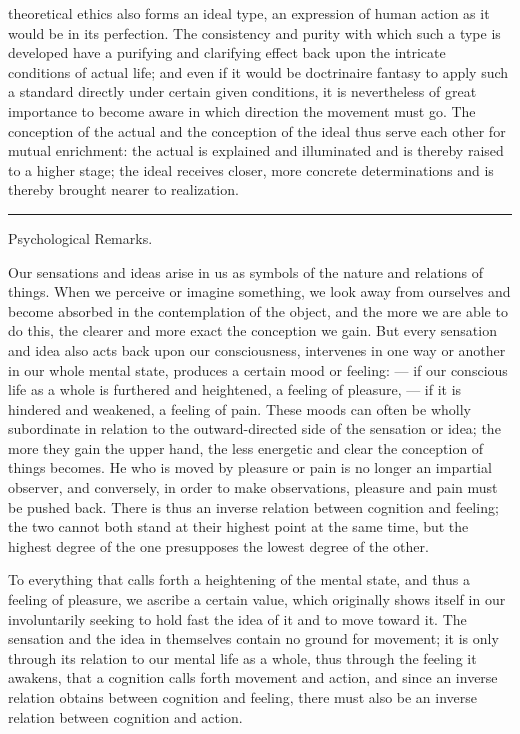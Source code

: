 \documentclass[12pt,a4paper,openany]{book}
\newcommand{\opage}[1]{\marginnote{\footnotesize\textit{[#1]}}}
\newcommand{\chap}[1]{\clearpage\addcontentsline{toc}{chapter}{#1}\vspace*{2em}\begin{center}{\large #1}\end{center}\medskip}
\begin{document}
theoretical ethics also forms an ideal type, an expression of human action
as it would be in its perfection. The consistency and purity with which such
a type is developed have a purifying and clarifying effect back upon the
intricate conditions of actual life; and even if it would be doctrinaire
fantasy to apply such a standard directly under certain given conditions, it
is nevertheless of great importance to become aware in which direction the
movement must go. The conception of the actual and the conception of the
ideal thus serve each other for mutual enrichment: the actual is explained
and illuminated and is thereby raised to a higher stage; the ideal receives
closer, more concrete determinations and is thereby brought nearer to
realization.

\begin{center}\rule{6em}{0.4pt}\end{center}

\chap{Psychological Remarks.}
\opage{7}Our sensations and ideas arise in us as symbols of the nature and
relations of things. When we perceive or imagine something, we look away
from ourselves and become absorbed in the contemplation of the object, and
the more we are able to do this, the clearer and more exact the conception
we gain. But every sensation and idea also acts back upon our
consciousness, intervenes in one way or another in our whole mental state,
produces a certain mood or feeling: --- if our conscious life as a whole is
furthered and heightened, a feeling of pleasure, --- if it is hindered and
weakened, a feeling of pain. These moods can often be wholly subordinate in
relation to the outward-directed side of the sensation or idea; the more
they gain the upper hand, the less energetic and clear the conception of
things becomes. He who is moved by pleasure or pain is no longer an
impartial observer, and conversely, in order to make observations,
\opage{8}pleasure and pain must be pushed back. There is thus an inverse
relation between cognition and feeling; the two cannot both stand at their
highest point at the same time, but the highest degree of the one
presupposes the lowest degree of the other.

To everything that calls forth a heightening of the mental state, and thus
a feeling of pleasure, we ascribe a certain value, which originally shows
itself in our involuntarily seeking to hold fast the idea of it and to move
toward it. The sensation and the idea in themselves contain no ground for
movement; it is only through its relation to our mental life as a whole,
thus through the feeling it awakens, that a cognition calls forth movement
and action, and since an inverse relation obtains between cognition and
feeling, there must also be an inverse relation between cognition and
action.
\end{document}
